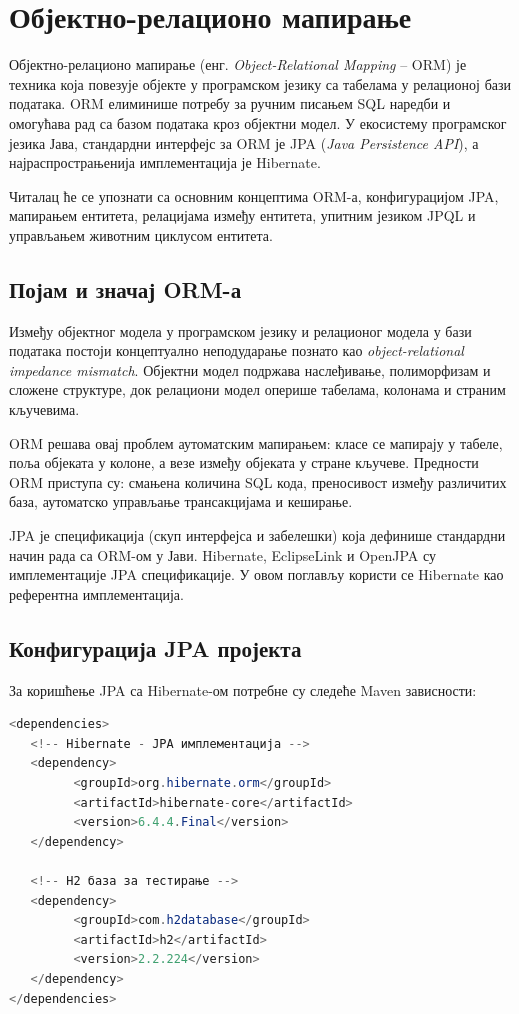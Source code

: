 \chapter{Објектно-релационо мапирање}

Објектно-релационо мапирање (енг. \textit{Object-Relational Mapping} – ORM) је техника која повезује објекте у програмском језику са табелама у релационој бази података. ORM елиминише потребу за ручним писањем SQL наредби и омогућава рад са базом података кроз објектни модел. У екосистему програмског језика Јава, стандардни интерфејс за ORM је JPA (\textit{Java Persistence API}), а најраспрострањенија имплементација је Hibernate.

Читалац ће се упознати са основним концептима ORM-а, конфигурацијом JPA, мапирањем ентитета, релацијама између ентитета, упитним језиком JPQL и управљањем животним циклусом ентитета.


\section{Појам и значај ORM-а}

Између објектног модела у програмском језику и релационог модела у бази података постоји концептуално неподударање познато као \textit{object-relational impedance mismatch}. Објектни модел подржава наслеђивање, полиморфизам и сложене структуре, док релациони модел оперише табелама, колонама и страним кључевима.

ORM решава овај проблем аутоматским мапирањем: класе се мапирају у табеле, поља објеката у колоне, а везе између објеката у стране кључеве. Предности ORM приступа су: смањена количина SQL кода, преносивост између различитих база, аутоматско управљање трансакцијама и кеширање.

JPA је спецификација (скуп интерфејса и забелешки) која дефинише стандардни начин рада са ORM-ом у Јави. Hibernate, EclipseLink и OpenJPA су имплементације JPA спецификације. У овом поглављу користи се Hibernate као референтна имплементација.


\section{Конфигурација JPA пројекта}

За коришћење JPA са Hibernate-ом потребне су следеће Maven зависности:


\begin{lstlisting}[language=Java]
<dependencies>
   <!-- Hibernate - JPA имплементација -->
   <dependency>
         <groupId>org.hibernate.orm</groupId>
         <artifactId>hibernate-core</artifactId>
         <version>6.4.4.Final</version>
   </dependency>
 
   <!-- H2 база за тестирање -->
   <dependency>
         <groupId>com.h2database</groupId>
         <artifactId>h2</artifactId>
         <version>2.2.224</version>
   </dependency>
</dependencies>
\end{lstlisting}


